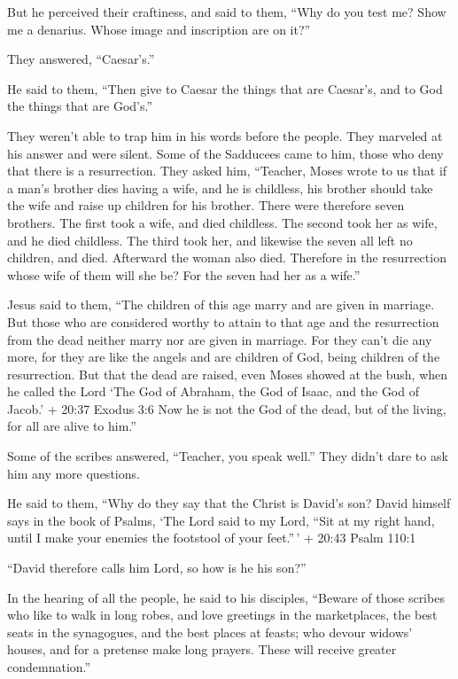  But he perceived their craftiness, and said to them, ``Why
do you test me?  Show me a denarius. Whose image and
inscription are on it?''

They answered, ``Caesar's.''

 He said to them, ``Then give to Caesar the things that are
Caesar's, and to God the things that are God's.''

 They weren't able to trap him in his words before the
people. They marveled at his answer and were silent.  Some
of the Sadducees came to him, those who deny that there is a
resurrection.  They asked him, ``Teacher, Moses wrote to us
that if a man's brother dies having a wife, and he is childless, his
brother should take the wife and raise up children for his brother.
 There were therefore seven brothers. The first took a
wife, and died childless.  The second took her as wife, and
he died childless.  The third took her, and likewise the
seven all left no children, and died.  Afterward the woman
also died.  Therefore in the resurrection whose wife of
them will she be? For the seven had her as a wife.''

 Jesus said to them, ``The children of this age marry and
are given in marriage.  But those who are considered worthy
to attain to that age and the resurrection from the dead neither marry
nor are given in marriage.  For they can't die any more,
for they are like the angels and are children of God, being children of
the resurrection.  But that the dead are raised, even Moses
showed at the bush, when he called the Lord `The God of Abraham, the God
of Isaac, and the God of Jacob.' + 20:37 Exodus 3:6  Now he
is not the God of the dead, but of the living, for all are alive to
him.''

 Some of the scribes answered, ``Teacher, you speak well.''
 They didn't dare to ask him any more questions.

 He said to them, ``Why do they say that the Christ is
David's son?  David himself says in the book of Psalms,
`The Lord said to my Lord, ``Sit at my right hand,  until I
make your enemies the footstool of your feet.''\,' + 20:43 Psalm 110:1

 ``David therefore calls him Lord, so how is he his son?''

 In the hearing of all the people, he said to his
disciples,  ``Beware of those scribes who like to walk in
long robes, and love greetings in the marketplaces, the best seats in
the synagogues, and the best places at feasts;  who devour
widows' houses, and for a pretense make long prayers. These will receive
greater condemnation.''


